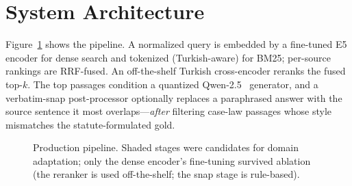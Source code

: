 \documentclass[conference]{IEEEtran}
\begin{document}
\section{System Architecture}
Figure~\ref{fig:arch} shows the pipeline. A normalized query is embedded by a
fine-tuned E5 encoder for dense search and tokenized (Turkish-aware) for BM25;
per-source rankings are RRF-fused. An off-the-shelf Turkish cross-encoder
reranks the fused top-$k$. The top passages condition a quantized
Qwen-2.5~\cite{qwen2024} generator, and a verbatim-snap post-processor
optionally replaces a paraphrased
answer with the source sentence it most overlaps---\emph{after} filtering
case-law passages whose style mismatches the statute-formulated gold.

\begin{figure}[t]
\centering
{}
\caption{Production pipeline. Shaded stages were candidates for domain
adaptation; only the dense encoder's fine-tuning survived ablation (the
reranker is used off-the-shelf; the snap stage is rule-based).}
\label{fig:arch}
\end{figure}
\end{document}
